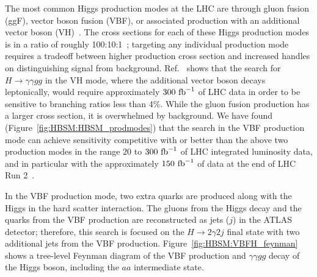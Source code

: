 The most common Higgs production modes at the LHC are through gluon fusion (ggF), vector boson fusion (VBF), or associated production with an additional vector boson (VH)~\cite{Dittmaier:2011ti}.
The cross sections for each of these Higgs production modes is in a ratio of roughly 100:10:1~\cite{deFlorian:2016spz}; targeting any individual production mode requires a tradeoff between higher production cross section and increased handles on distinguishing signal from background.
Ref.~\cite{hep-ph/0703247} shows that the search for $H \to \gamma\gamma gg$ in the VH mode, 
where the additional vector boson
decays leptonically, would require approximately $300~\mathrm{fb}^{-1}$ of LHC data in order to be sensitive to branching ratios less than 4\%. 
While the gluon fusion production has a larger cross section, it is overwhelmed by background.
We have found (Figure~\ref{fig:HBSM:HBSM_prodmodes}) that the search in the VBF production 
mode can achieve sensitivity competitive with or better than the above two production modes in the range $20$ to $300~\mathrm{fb}^{-1}$ of LHC integrated luminosity data,
and in particular with the approximately $150~\mathrm{fb}^{-1}$ of data at the end of LHC Run 2~\cite{lhc-commissioning}.

In the VBF production mode, two extra quarks are produced along with the Higgs in the hard scatter interaction.
The gluons from the Higgs decay and the quarks from the VBF production are reconstructed as jets ($j$) in the ATLAS detector;
therefore, this search is focused on the $H\to2\gamma2j$ final state with two additional jets from the VBF production.
Figure~\ref{fig:HBSM:VBFH_feynman} shows a tree-level Feynman diagram of the VBF production and $\gamma\gamma gg$ decay of the Higgs boson, including the $aa$ intermediate state.

